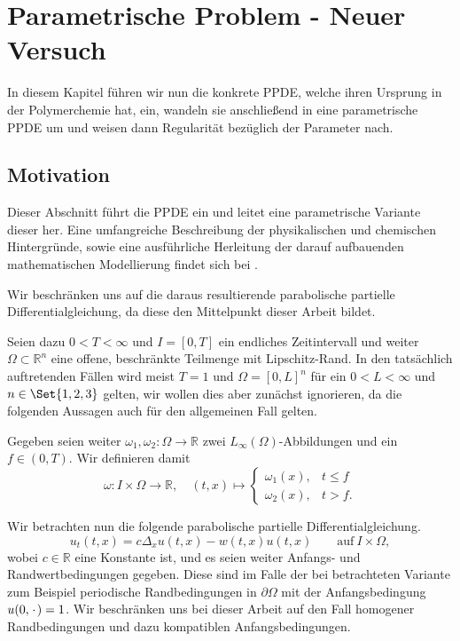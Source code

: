
\chapter{Parametrische Problem - Neuer Versuch} %
\label{cha:parametrische_problem_neuer_versuch}

In diesem Kapitel führen wir nun die konkrete PPDE, welche ihren Ursprung in der Polymerchemie hat, ein, wandeln sie anschließend in eine parametrische PPDE um und weisen dann Regularität bezüglich der Parameter nach.

\section{Motivation} %
\label{sec:einf_hrung_der_ppde}

Dieser Abschnitt führt die PPDE ein und leitet eine parametrische Variante dieser her.
Eine umfangreiche Beschreibung der physikalischen und chemischen Hintergründe, sowie eine ausführliche Herleitung der darauf aufbauenden mathematischen Modellierung findet sich bei \textcite{Fredrickson:2006th}.

Wir beschränken uns auf die daraus resultierende parabolische partielle Differentialgleichung, da diese den Mittelpunkt dieser Arbeit bildet.

Seien dazu $0 < T < \infty$ und $I = [0, T]$ ein endliches Zeitintervall und weiter $\Omega \subset \mathbb{R}^{n}$ eine offene, beschränkte Teilmenge mit Lipschitz-Rand.
In den tatsächlich auftretenden Fällen wird meist $T = 1$ und $\Omega = [0, L]^n$ für ein $0 < L < \infty$ und $n \in \Set{1, 2, 3}$ gelten, wir wollen dies aber zunächst ignorieren, da die folgenden Aussagen auch für den allgemeinen Fall gelten.

Gegeben seien weiter $\omega_{1}, \omega_{2} \colon \Omega \to \mathbb{R}$ zwei $L_{\infty}(\Omega)$-Abbildungen und ein $f \in (0, T)$.
Wir definieren damit
\begin{equation}
    \omega \colon I \times \Omega \to \mathbb{R}, \quad (t, x) \mapsto
    \begin{cases}
        \omega_{1}(x), & t \leq f \\
        \omega_{2}(x), & t > f.
    \end{cases}
\end{equation}

Wir betrachten nun die folgende parabolische partielle Differentialgleichung.
\begin{equation}
    u_{t}(t, x) = c \Delta_{x} u(t, x) - w(t, x) u(t, x) \qquad \text{auf}~I \times \Omega,
\end{equation}
wobei $c \in \mathbb{R}$ eine Konstante ist, und es seien weiter Anfangs- und Randwertbedingungen gegeben.
Diese sind im Falle der bei \textcite{Stasiak:2011ba} betrachteten Variante zum Beispiel periodische Randbedingungen in $\partial \Omega$ mit der Anfangsbedingung $u(0, {\mkern2mu\cdot\mkern2mu}) = 1$.
Wir beschränken uns bei dieser Arbeit auf den Fall homogener Randbedingungen und
dazu kompatiblen Anfangsbedingungen.

